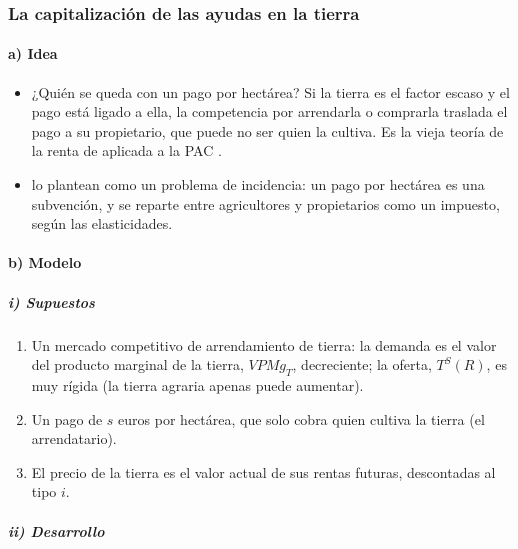 \documentclass[11pt]{article}
\begin{document}
\subsubsection{La capitalización de las ayudas en la tierra}\label{sec:capitalizacion}

\paragraph{a) Idea}

\begin{itemize}
\item ¿Quién se queda con un pago por hectárea? Si la tierra es el factor escaso y el pago está ligado a ella, la competencia por arrendarla o comprarla traslada el pago a su propietario, que puede no ser quien la cultiva. Es la vieja teoría de la renta de  aplicada a la PAC .
\item \textcite{BaldwinWyplosz2020Economics} lo plantean como un problema de incidencia: un pago por hectárea es una subvención, y se reparte entre agricultores y propietarios como un impuesto, según las elasticidades.
\end{itemize}

\paragraph{b) Modelo}

\subparagraph{i) Supuestos}

\begin{enumerate}
\item Un mercado competitivo de arrendamiento de tierra: la demanda es el valor del producto marginal de la tierra, $\mathit{VPMg}_T$, decreciente; la oferta, $T^S(R)$, es muy rígida (la tierra agraria apenas puede aumentar).
\item Un pago de $s$ euros por hectárea, que solo cobra quien cultiva la tierra (el arrendatario).
\item El precio de la tierra es el valor actual de sus rentas futuras, descontadas al tipo $i$.
\end{enumerate}

\subparagraph{ii) Desarrollo}
\end{document}
